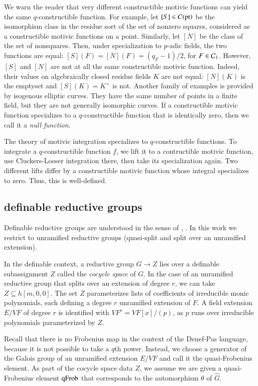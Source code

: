 We warn the reader that very different constructible motivic functions
can yield the same $q$-constructible function.  For example, let
$[S]\in C({\operatorname{pt}})$ be the isomorphism class in the residue sort of
the set of nonzero squares, considered as a constructible motivic
functions on a point.  Similarly, let $[N]$ be the class of the set of
nonsquares.  Then, under specialization to $p$-adic fields, the two
functions are equal: $[S](F) = [N](F) = (q_F-1)/2$, for
$F\in\mathcal C_1$. However, $[S]$ and $[N]$ are not at all the same
constructible motivic function. Indeed, their values on algebraically
closed residue fields $K$ are not equal: $[N](K)$ is the emptyset and
$[S](K) = K^\times$ is not.  Another family of examples is provided by
isogenous elliptic curves.  They have the same number of points in a
finite field, but they are not generally isomorphic curves.  If a
constructible motivic function specializes to a $q$-constructible
function that is identically zero, then we call it a {\it null function}.

The theory of motivic integration specializes to $q$-constructible
functions. To integrate a $q$-constructible function $f$, we lift it
to a contructible motivic function, use Cluckers-Loeser integration
there, then take its specialization again.  Two different lifts differ
by a constructible motivic function whose integral specializes to
zero. Thus, this is well-defined.

\subsection{definable reductive groups}

Definable reductive groups are understood in the sense of
\cite{cluckers2011transfer}, \cite{gordon}.  In this work we restrict
to unramified reductive groups (quasi-split and split over an
unramified extension).

In the definable context, a reductive group $G\to Z$ lies over a
definable subassignment $Z$ called the {\it cocycle space} of $G$.  In
the case of an unramified reductive group that splits over an
extension of degree $r$, we can take $Z\subseteq h[m,0,0]$.  The set
$Z$ parameterizes lists of coefficients of irreducible monic
polynomials, each defining a degree $r$ unramified extension of $F$.
A field extension $E/VF$ of degree $r$ is identified with $VF^r =
VF[x]/(p)$, as $p$ runs over irreducible polynomials parameterized by
$Z$.

Recall that there is no Frobenius map in the context of the Denef-Pas
language, because it is not possible to take a $q$th power.  Instead,
we choose a generator of the Galois group of an unramified extension
$E/VF$ and call it the quasi-Frobenius element.  As part of the
cocycle space data $Z$, we assume we are given a quasi-Frobenius
element ${\operatorname{qFrob}}$ that corresponds to the automorphism $\theta$ of
$\hat G$.

